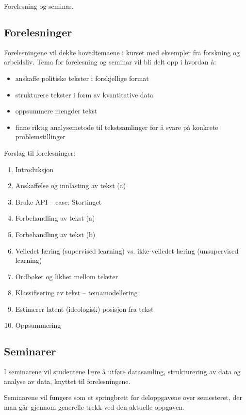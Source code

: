 \documentclass[12pt,a4paper,norsk]{article}
\begin{document}
Forelesning og seminar.



\subsection*{Forelesninger}

Forelesningene vil dekke hovedtemaene i kurset med eksempler fra forskning og arbeidsliv. Tema for forelesning og seminar vil bli delt opp i hvordan å:

\begin{itemize}
  \item anskaffe politiske tekster i forskjellige format
  \item strukturere tekster i form av kvantitative data
  \item oppsummere mengder tekst
  \item finne riktig analysemetode til tekstsamlinger for å svare på konkrete problemstillinger
\end{itemize}

Forslag til forelesninger:

\begin{enumerate}
  \item Introduksjon
  \item Anskaffelse og innlasting av tekst (a)
  \item Bruke API -- case: Stortinget
  \item Forbehandling av tekst (a)
  \item Forbehandling av tekst (b)
  \item Veiledet læring (supervised learning) vs. ikke-veiledet læring (unsupervised learning)
  \item Ordbøker og likhet mellom tekster
  \item Klassifisering av tekst -- temamodellering
  \item Estimerer latent (ideologisk) posisjon fra tekst
  \item Oppsummering
\end{enumerate}

\subsection*{Seminarer}

I seminarene vil studentene lære å utføre datasamling, strukturering av data og analyse av data, knyttet til forelesningene.

Seminarene vil fungere som et springbrett for deloppgavene over semesteret, der man går gjennom generelle trekk ved den aktuelle oppgaven.
\end{document}
